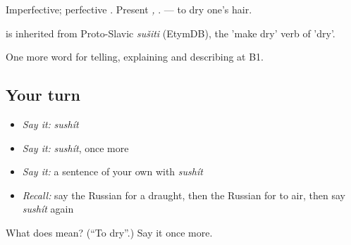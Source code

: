 Imperfective; perfective \emph{}. Present \emph{, }. \emph{ } — to dry one's hair.

\begin{cousinweb}
\emph{} is inherited from Proto-Slavic \emph{sušiti} (EtymDB), the 'make dry' verb of \emph{} 'dry'.
\end{cousinweb}

\begin{grammarlens}[title={What you've built}]
One more word for telling, explaining and describing at B1.
\end{grammarlens}

\subsection*{Your turn}
\begin{itemize}
\raggedright
  \item \emph{Say it:} \emph{sushít}
  \item \emph{Say it:} \emph{sushít}, once more
  \item \emph{Say it:} a sentence of your own with \emph{sushít}
  \item \emph{Recall:} say the Russian for a draught, then the Russian for to air, then say \emph{sushít} again
\end{itemize}

\begin{tcolorbox}[breakable,colback=teal!4,colframe=teal!35!black,title={Before you move on}]
What does  mean? (\textquotedblleft{}To dry\textquotedblright{}.) Say it once more.
\end{tcolorbox}

